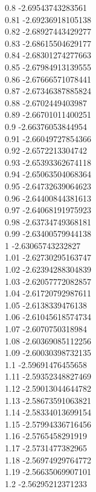 {0.8	-2.69543743283561\\
0.81	-2.69236918105138\\
0.82	-2.68927443429277\\
0.83	-2.68615504629177\\
0.84	-2.68301274277663\\
0.85	-2.67984913139555\\
0.86	-2.67666571078441\\
0.87	-2.67346387885824\\
0.88	-2.6702449403987\\
0.89	-2.66701011400251\\
0.9	-2.66376053844954\\
0.91	-2.66049727854366\\
0.92	-2.6572213304742\\
0.93	-2.65393362674118\\
0.94	-2.65063504068364\\
0.95	-2.64732639064623\\
0.96	-2.64400844381613\\
0.97	-2.64068191975923\\
0.98	-2.63734749368181\\
0.99	-2.63400579944138\\
1	-2.63065743232827\\
1.01	-2.62730295163747\\
1.02	-2.62394288304839\\
1.03	-2.62057772082857\\
1.04	-2.61720792987611\\
1.05	-2.6138339476138\\
1.06	-2.61045618574734\\
1.07	-2.6070750318984\\
1.08	-2.60369085112256\\
1.09	-2.60030398732135\\
1.1	-2.59691476455658\\
1.11	-2.59352348827469\\
1.12	-2.59013044644782\\
1.13	-2.58673591063821\\
1.14	-2.58334013699154\\
1.15	-2.57994336716456\\
1.16	-2.5765458291919\\
1.17	-2.5731477382965\\
1.18	-2.56974929764772\\
1.19	-2.56635069907101\\
1.2	-2.56295212371233\\
}
